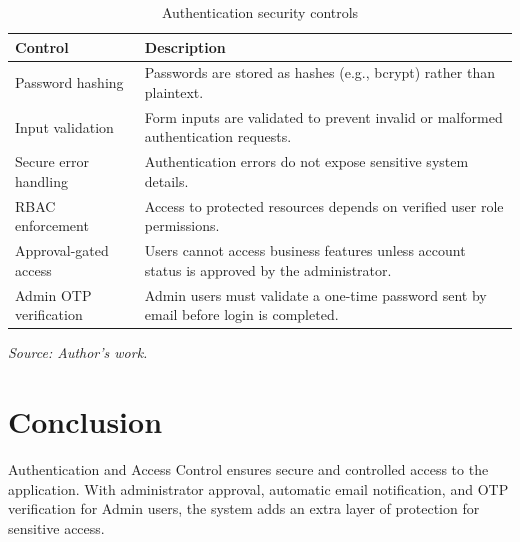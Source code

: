 \begin{table}[H]
	\centering
	\renewcommand{\arraystretch}{1.2}
	\begin{tabular}{|l|>{\raggedright\arraybackslash}p{9.8cm}|}
		\hline
		\textbf{Control} & \textbf{Description} \\
		\hline
		Password hashing & Passwords are stored as hashes (e.g., bcrypt) rather than plaintext. \\
		\hline
		Input validation & Form inputs are validated to prevent invalid or malformed authentication requests. \\
		\hline
		Secure error handling & Authentication errors do not expose sensitive system details. \\
		\hline
		RBAC enforcement & Access to protected resources depends on verified user role permissions. \\
		\hline
		Approval-gated access & Users cannot access business features unless account status is approved by the administrator. \\
		\hline
		Admin OTP verification & Admin users must validate a one-time password sent by email before login is completed. \\
		\hline
	\end{tabular}
	\caption{Authentication security controls}
	\label{tab:authentication-security-controls}
	{\footnotesize\textit{Source: Author's work.}}
\end{table}

\section{Conclusion}
Authentication and Access Control ensures secure and controlled access to the application. With administrator approval, automatic email notification, and OTP verification for Admin users, the system adds an extra layer of protection for sensitive access.
